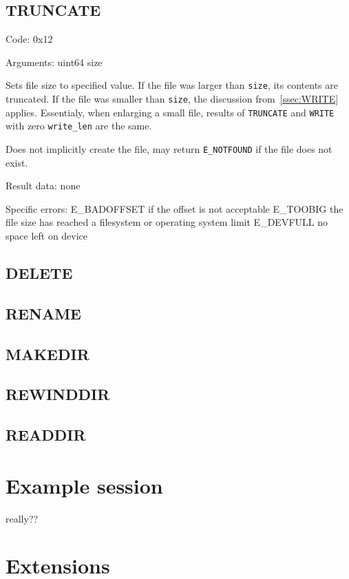 \subsection{TRUNCATE}

Code: 0x12

Arguments:
uint64 size

Sets file size to specified value. If the file was larger than {\tt size}, its contents are truncated. If the
file was smaller than {\tt size}, the discussion from~\ref{ssec:WRITE} applies. Essentialy, when enlarging
a small file, results of {\tt TRUNCATE} and {\tt WRITE} with zero {\tt write\_len} are the same.

Does not implicitly create the file, may return {\tt E\_NOTFOUND} if the file does not exist.

Result data: none

Specific errors:
	E\_BADOFFSET if the offset is not acceptable
	E\_TOOBIG the file size has reached a filesystem or operating system limit
	E\_DEVFULL no space left on device

\subsection{DELETE}

\subsection{RENAME}

\subsection{MAKEDIR}

\subsection{REWINDDIR}

\subsection{READDIR}



\section{Example session}

really??


\section{Extensions}

